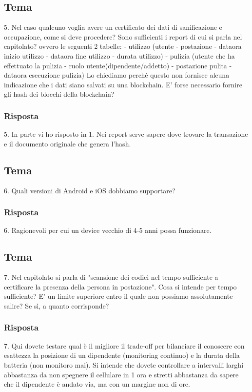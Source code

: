 \subsection*{Tema}
5. Nel caso qualcuno voglia avere un certificato dei dati di sanificazione e occupazione, come si deve procedere? Sono sufficienti i report di cui si parla nel capitolato? ovvero le seguenti 2 tabelle:
- utilizzo (utente - postazione - dataora inizio utilizzo - dataora fine utilizzo - durata utilizzo)
- pulizia (utente che ha effettuato la pulizia - ruolo utente(dipendente/addetto) - postazione pulita - dataora esecuzione pulizia)
Lo chiediamo perché questo non fornisce alcuna indicazione che i dati siano salvati su una blockchain. E' forse necessario fornire gli hash dei blocchi della blockchain?
\subsubsection{Risposta}
5. In parte vi ho risposto in 1. Nei report serve sapere dove trovare la transazione e il documento originale che genera l'hash.

\subsection*{Tema}
6. Quali versioni di Android e iOS dobbiamo supportare?
\subsubsection{Risposta}
6. Ragionevoli per cui un device vecchio di 4-5 anni possa funzionare.


\subsection*{Tema}
7. Nel capitolato si parla di "scansione dei codici nel tempo sufficiente a certificare la presenza della persona in postazione". Cosa si intende per tempo sufficiente? E' un limite superiore entro il quale non possiamo assolutamente salire? Se sì, a quanto corrisponde?
\subsubsection{Risposta}
7. Qui dovete testare qual è il migliore il trade-off per bilanciare il conoscere con esattezza la posizione di un dipendente (monitoring continuo) e la durata della batteria (non monitoro mai). Si intende che dovete controllare a intervalli larghi abbastanza da non spegnere il cellulare in 1 ora e stretti abbastanza da sapere che il dipendente è andato via, ma con un margine non di ore.



